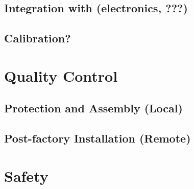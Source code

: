 \subsection{Integration with (electronics, ???)}
\label{sec:fddp-daq-install-pd-???}


\subsection{Calibration?}
\label{sec:fddp-daq-install-calib}



\section{Quality Control}
\label{sec:fddp-daq-qc}

\subsection{Protection and Assembly (Local)}
\label{sec:fddp-daq-qc-local}


\subsection{Post-factory Installation (Remote)}
\label{sec:fddp-daq-qc-remote}





\section{Safety}
\label{sec:fddp-daq-safety}






